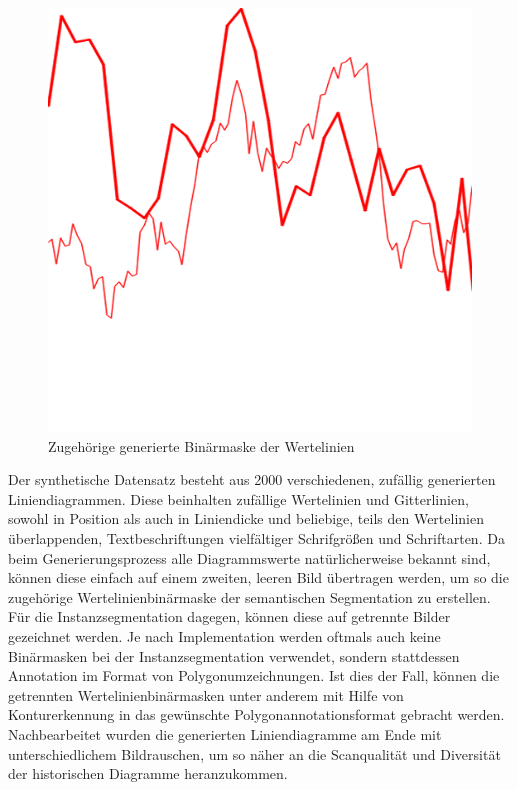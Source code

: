 \begin{figure}[h!]
\begin{minipage}{0.475\textwidth}
        \includegraphics[width=\linewidth]{Methodik/img/lines_synthetic_mask.png}
        \caption{ Zugehörige generierte Binärmaske der Wertelinien}
        \label{fig:lines_synthetic_mask}
    \end{minipage}
\end{figure}

Der synthetische Datensatz besteht aus 2000 verschiedenen, zufällig generierten Liniendiagrammen. Diese beinhalten zufällige Wertelinien und Gitterlinien, sowohl in Position als auch in Liniendicke und beliebige, teils den Wertelinien überlappenden, Textbeschriftungen vielfältiger Schrifgrößen und Schriftarten. Da beim Generierungsprozess alle Diagrammswerte natürlicherweise bekannt sind, können diese einfach auf einem zweiten, leeren Bild übertragen werden, um so die zugehörige Wertelinienbinärmaske der semantischen Segmentation zu erstellen. Für die Instanzsegmentation dagegen, können diese auf getrennte Bilder gezeichnet werden. Je nach Implementation werden oftmals auch keine Binärmasken bei der Instanzsegmentation verwendet, sondern stattdessen Annotation im Format von Polygonumzeichnungen. Ist dies der Fall, können die getrennten Wertelinienbinärmasken unter anderem mit Hilfe von Konturerkennung in das gewünschte Polygonannotationsformat gebracht werden. Nachbearbeitet wurden die generierten Liniendiagramme am Ende mit unterschiedlichem Bildrauschen, um so näher an die Scanqualität und Diversität der historischen Diagramme heranzukommen.

